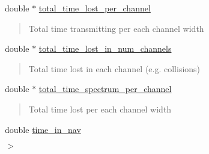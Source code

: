 \begin{DoxyCompactItemize}
\begin{DoxyCompactList}
\end{DoxyCompactList}\item 
\mbox{\label{structPerformance_ab6e43a8058bf2c409a2bad06b72befef}} 
double $\ast$ \hyperlink{structPerformance_ab6e43a8058bf2c409a2bad06b72befef}{total\+\_\+time\+\_\+lost\+\_\+per\+\_\+channel}
\begin{DoxyCompactList}\small\item\em \begin{quote}
Total time transmitting per each channel width \end{quote}
\end{DoxyCompactList}\item 
\mbox{\label{structPerformance_abee8bdf8e12a825171d2aaca4754dd57}} 
double $\ast$ \hyperlink{structPerformance_abee8bdf8e12a825171d2aaca4754dd57}{total\+\_\+time\+\_\+lost\+\_\+in\+\_\+num\+\_\+channels}
\begin{DoxyCompactList}\small\item\em \begin{quote}
Total time lost in each channel (e.\+g. collisions) \end{quote}
\end{DoxyCompactList}\item 
\mbox{\label{structPerformance_aa9beca5b594dc6d77d477cdbd5d380dc}} 
double $\ast$ \hyperlink{structPerformance_aa9beca5b594dc6d77d477cdbd5d380dc}{total\+\_\+time\+\_\+spectrum\+\_\+per\+\_\+channel}
\begin{DoxyCompactList}\small\item\em \begin{quote}
Total time lost per each channel width \end{quote}
\end{DoxyCompactList}\item 
\mbox{\label{structPerformance_a8dcbe2912d18cccf50d9aa9ed1a6b2a5}} 
double \hyperlink{structPerformance_a8dcbe2912d18cccf50d9aa9ed1a6b2a5}{time\+\_\+in\+\_\+nav}
\begin{DoxyCompactList}\small\item\em $>$ \end{DoxyCompactList}\item 
\mbox{\label{structPerformance_acc204ea568287cc6c0dfd9193f9f512c}} 

\end{DoxyCompactItemize}
